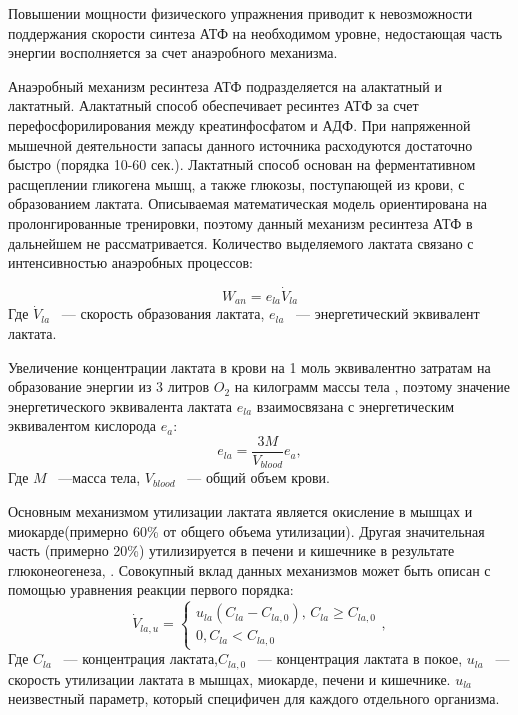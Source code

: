 Повышении мощности физического упражнения приводит к невозможности поддержания скорости синтеза АТФ на необходимом уровне, недостающая часть энергии восполняется за счет анаэробного механизма.

Анаэробный механизм ресинтеза АТФ подразделяется на алактатный и лактатный. Алактатный способ обеспечивает ресинтез АТФ за счет перефосфорилирования между креатинфосфатом и АДФ. При напряженной мышечной деятельности запасы данного источника расходуются достаточно быстро (порядка 10-60 сек.). Лактатный способ основан на ферментативном расщеплении гликогена мышц, а также глюкозы, поступающей из крови, с образованием лактата.  Описываемая математическая модель ориентирована на пролонгированные тренировки, поэтому данный механизм ресинтеза АТФ в дальнейшем не рассматривается. 
Количество выделяемого лактата связано с интенсивностью анаэробных процессов:

\begin{equation}\label{eq:Wan}
W_{an}=e_{la}\dot{V}_{la}
\end{equation}
Где \( \dot{V}_{la} \) ~--- скорость образования лактата, \(e_{la}\) ~--- энергетический эквивалент лактата.

Увеличение концентрации лактата в крови на 1 моль эквивалентно затратам на образование энергии из 3 литров \( O_{2} \) на килограмм массы тела \cite{prampero1999,prampero1981}, поэтому значение энергетического эквивалента лактата \(e_{la}\) взаимосвязана с энергетическим эквивалентом кислорода \(e_{a}\): 
\begin{equation} \label{eq:a_la_eqviv}
e_{la}=\frac{3M}{V_{blood}}e_{a},
\end{equation}
Где \( M \)  ~---масса тела, \(V_{blood}\) ~--- общий объем крови.


Основным механизмом утилизации лактата является окисление в мышцах и миокарде(примерно 60\% от общего объема утилизации). Другая значительная часть (примерно 20\%) утилизируется в печени и кишечнике в результате глюконеогенеза, . Совокупный вклад данных механизмов может быть описан с помощью уравнения реакции первого порядка:
\begin{equation}
\dot{V}_{la,u}=
\begin{cases}
u_{la}\left(C_{la}-C_{la,0}\right), \, C_{la} \geq C_{la,0} \\
0, C_{la} < C_{la,0}
\end{cases},
\label{laUtEq}
\end{equation}
Где \(C_{la} \) ~--- концентрация лактата,\(C_{la,0} \) ~--- концентрация лактата в покое, \(u_{la} \) ~--- скорость утилизации лактата в мышцах, миокарде, печени и кишечнике. \(u_{la} \) неизвестный параметр, который специфичен для каждого отдельного организма.

